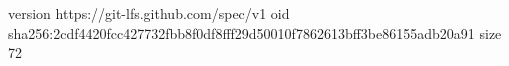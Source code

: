 version https://git-lfs.github.com/spec/v1
oid sha256:2cdf4420fcc427732fbb8f0df8fff29d50010f7862613bff3be86155adb20a91
size 72
